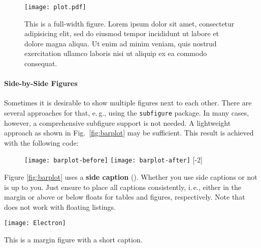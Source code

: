 \begin{figure*}[t]
\texttt{[image: plot.pdf]}
\caption{\label{fig:widefig}This is a full-width figure. Lorem ipsum dolor sit amet, consectetur adipisicing elit, sed do eiusmod tempor incididunt ut labore et dolore magna aliqua. Ut enim ad minim veniam, quis nostrud exercitation ullamco laboris nisi ut aliquip ex ea commodo consequat.}
\end{figure*}


\paragraph{Side-by-Side Figures} Sometimes it is desirable to show multiple figures next to each other. There are several approaches for that, e.\,g., using the \texttt{subfigure} package. In many cases, however, a comprehensive subfigure support is not needed. A lightweight approach as shown in Fig.~\ref{fig:barplot} may be sufficient. This result is achieved with the following code:
\begin{latex}
\begin{figure}[t]
\centering
\texttt{[image: barplot-before]}%
\hspace{\fill}%
\texttt{[image: barplot-after]}
[-2\baselineskip]
\end{figure}
\end{latex}

Figure \ref{fig:barplot} uses a \textbf{side caption} (). Whether you use side captions or not is up to you.
Just ensure to place all captions consistently, i.\,e., either in the margin or above or below floats for tables and figures, respectively. Note that  does not work with floating listings.


\begin{marginfigure}[1\baselineskip] %
\texttt{[image: Electron]}
\caption{\label{fig:marfig}This is a margin figure with a short caption.}
\end{marginfigure}

